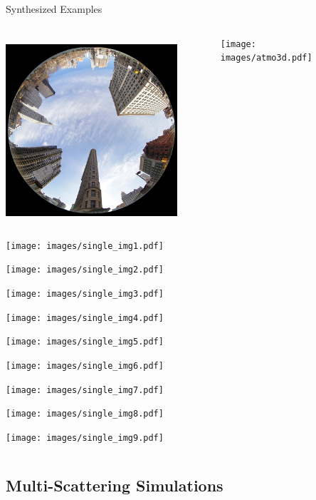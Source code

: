 \documentclass[compress,red,12pt]{beamer}
\begin{document}

\begin{frame}{Synthesized Examples}
  \begin{columns}[C]
    \begin{column}{.7\textwidth}
      \begin{overlayarea}{\columnwidth}{8cm}
        {\centerline{\includegraphics[height=7cm]{images/fisheye.jpg}}}
        {\centerline{\texttt{[image: images/single\_img1.pdf]}}}
        {\centerline{\texttt{[image: images/single\_img2.pdf]}}}
        {\centerline{\texttt{[image: images/single\_img3.pdf]}}}
        {\centerline{\texttt{[image: images/single\_img4.pdf]}}}
        {\centerline{\texttt{[image: images/single\_img5.pdf]}}}
        {\centerline{\texttt{[image: images/single\_img6.pdf]}}}
        {\centerline{\texttt{[image: images/single\_img7.pdf]}}}
        {\centerline{\texttt{[image: images/single\_img8.pdf]}}}
        {\centerline{\texttt{[image: images/single\_img9.pdf]}}}
      \end{overlayarea}
    \end{column}
    \begin{column}{.3\textwidth}
      \begin{figure}
        \centering
        \texttt{[image: images/atmo3d.pdf]}
      \end{figure}
    \end{column}
  \end{columns}
\end{frame}


\subsection{Multi-Scattering Simulations}
\end{document}
